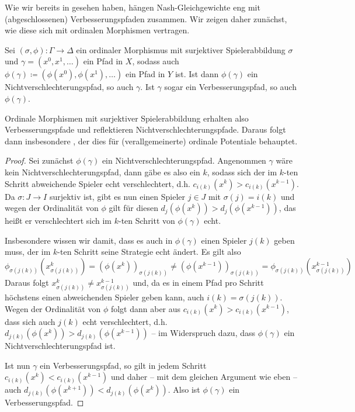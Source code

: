 Wie wir bereits in  gesehen haben, hängen Nash-Gleichgewichte eng mit (abgeschlossenen) Verbesserungspfaden zusammen. Wir zeigen daher zunächst, wie diese sich mit ordinalen Morphismen vertragen.

\begin{prop}\label{prop:NVReflVerbErh}
	Sei $(\sigma, \phi): \Gamma \to \Delta$ ein ordinaler Morphismus mit surjektiver Spielerabbildung $\sigma$ und $\gamma = (x^0, x^1, \dots)$ ein Pfad in $X$, sodass auch $\phi(\gamma) \coloneqq (\phi(x^0), \phi(x^1), \dots)$ ein Pfad in $Y$ ist. Ist dann $\phi(\gamma)$ ein Nichtverschlechterungspfad, so auch $\gamma$. Ist $\gamma$ sogar ein Verbesserungspfad, so auch $\phi(\gamma)$.
\end{prop}

Ordinale Morphismen mit surjektiver Spielerabbildung erhalten also Verbesserungspfade und reflektieren Nichtverschlechterungspfade. Daraus folgt dann insbesondere , der dies für (verallgemeinerte) ordinale Potentiale behauptet.

\begin{proof}
	Sei zunächst $\phi(\gamma)$ ein Nichtverschlechterungspfad. Angenommen $\gamma$ wäre kein Nichtverschlechterungspfad, dann gäbe es also ein $k$, sodass sich der im $k$-ten Schritt abweichende Spieler echt verschlechtert, d.h. $c_{i(k)}(x^k) > c_{i(k)}(x^{k-1})$. Da $\sigma: J \to I$ surjektiv ist, gibt es nun einen Spieler $j \in J$ mit $\sigma(j) = i(k)$ und wegen der Ordinalität von $\phi$ gilt für diesen $d_j(\phi(x^k)) > d_j(\phi(x^{k-1}))$, das heißt er verschlechtert sich im $k$-ten Schritt von $\phi(\gamma)$ echt. 
	
	Insbesondere wissen wir damit, dass es auch in $\phi(\gamma)$ einen Spieler $j(k)$ geben muss, der im $k$-ten Schritt seine Strategie echt ändert. Es gilt also
		\[\phi_{\sigma(j(k))}\left(x_{\sigma(j(k))}^k\right) = \left(\phi(x^k)\right)_{\sigma(j(k))} \neq \left(\phi(x^{k-1})\right)_{\sigma(j(k))} = \phi_{\sigma(j(k))}\left(x_{\sigma(j(k))}^{k-1}\right)\]
	Daraus folgt $x_{\sigma(j(k))}^k \neq x_{\sigma(j(k))}^{k-1}$ und, da es in einem Pfad pro Schritt höchstens einen abweichenden Spieler geben kann, auch $i(k) = \sigma(j(k))$. Wegen der Ordinalität von $\phi$ folgt dann aber aus $c_{i(k)}(x^k) > c_{i(k)}(x^{k-1})$, dass sich auch $j(k)$ echt verschlechtert, d.h. $d_{j(k)}(\phi(x^k)) > d_{j(k)}(\phi(x^{k-1}))$ -- im Widerspruch dazu, dass $\phi(\gamma)$ ein Nichtverschlechterungspfad ist.

	Ist nun $\gamma$ ein Verbesserungspfad, so gilt in jedem Schritt $c_{i(k)}(x^{k}) < c_{i(k)}(x^{k-1})$ und daher -- mit dem gleichen Argument wie eben -- auch $d_{j(k)}(\phi(x^{k+1})) < d_{j(k)}(\phi(x^k))$. Also ist $\phi(\gamma)$ ein Verbesserungspfad.
\end{proof}

